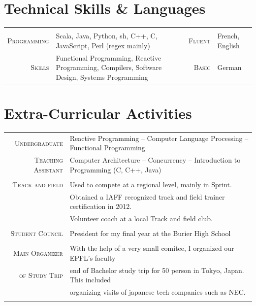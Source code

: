 \documentclass[a4paper,11pt]{article} %
\begin{document}
\section{Technical Skills \& Languages}
\begin{center}

\vspace{-0.3cm}
\begin{tabularx}{\textwidth}{rX|rl}

& & & \\
\textsc{\large{Programming}} & Scala, Java, Python, sh, C++, C, JavaScript, Perl (regex mainly) &
\textsc{\large{Fluent}} & French, English \\
\textsc{\large{Skills}} & Functional Programming, Reactive Programming, Compilers, Software Design, Systems Programming &
\textsc{\large{Basic}} & German \\

\end{tabularx}

\end{center}


\section{Extra-Curricular Activities}
\begin{tabular}{rl}
\textsc{\large{Undergraduate}} &
Reactive Programming --
Computer Language Processing -- Functional Programming \\
\textsc{\large{Teaching Assistant}} &
Computer Architecture -- Concurrency -- Introduction to Programming (C, C++, Java) \\
\multicolumn{2}{c}{} \\

\textsc{\large{Track and field}} &
Used to compete at a regional level, mainly in Sprint.\\
& Obtained a IAFF recognized track and field trainer certification in 2012. \\
& Volunteer coach at a local Track and field club.\\
\multicolumn{2}{c}{} \\

\textsc{\large{Student Council}} &
President for my final year at the Burier High School \\
\multicolumn{2}{c}{} \\

\textsc{\large{Main Organizer}} & With the help of a very small comitee, I organized our EPFL's faculty\\
\textsc{\large{of Study Trip}} & end of Bachelor study trip for 50 person in Tokyo, Japan. This included\\
    & organizing visits of japanese tech companies such as NEC.\\
\multicolumn{2}{c}{} \\

\end{tabular}
\end{document}
